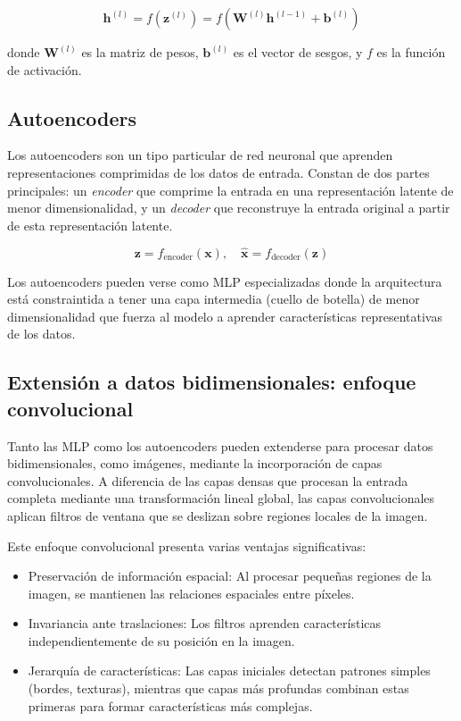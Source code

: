\begin{equation}
\mathbf{h}^{(l)} = f(\mathbf{z}^{(l)}) = f(\mathbf{W}^{(l)}\mathbf{h}^{(l-1)} + \mathbf{b}^{(l)})
\end{equation}

donde $\mathbf{W}^{(l)}$ es la matriz de pesos, $\mathbf{b}^{(l)}$ es el vector de sesgos, y $f$ es la función de activación.

\subsection{Autoencoders}

Los autoencoders son un tipo particular de red neuronal que aprenden representaciones comprimidas de los datos de entrada. Constan de dos partes principales: un \textit{encoder} que comprime la entrada en una representación latente de menor dimensionalidad, y un \textit{decoder} que reconstruye la entrada original a partir de esta representación latente.

\begin{equation}
\mathbf{z} = f_{\text{encoder}}(\mathbf{x}), \quad \hat{\mathbf{x}} = f_{\text{decoder}}(\mathbf{z})
\end{equation}

Los autoencoders pueden verse como MLP especializadas donde la arquitectura está constraintida a tener una capa intermedia (cuello de botella) de menor dimensionalidad que fuerza al modelo a aprender características representativas de los datos.

\subsection{Extensión a datos bidimensionales: enfoque convolucional}

Tanto las MLP como los autoencoders pueden extenderse para procesar datos bidimensionales, como imágenes, mediante la incorporación de capas convolucionales. A diferencia de las capas densas que procesan la entrada completa mediante una transformación lineal global, las capas convolucionales aplican filtros de ventana que se deslizan sobre regiones locales de la imagen.

Este enfoque convolucional presenta varias ventajas significativas:
\begin{itemize}
    \item Preservación de información espacial: Al procesar pequeñas regiones de la imagen, se mantienen las relaciones espaciales entre píxeles.
    \item Invariancia ante traslaciones: Los filtros aprenden características independientemente de su posición en la imagen.
    \item Jerarquía de características: Las capas iniciales detectan patrones simples (bordes, texturas), mientras que capas más profundas combinan estas primeras para formar características más complejas.
\end{itemize}

